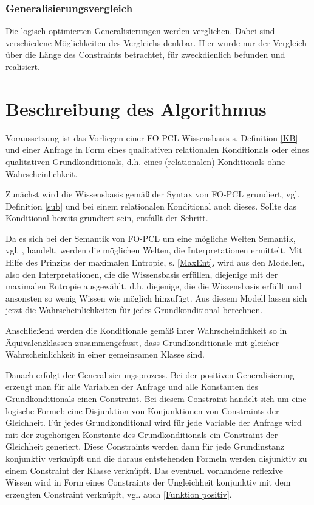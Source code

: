 \documentclass[a4paper, 11pt]{book}
\begin{document}
{\subsubsection{Generalisierungsvergleich}
Die logisch optimierten Generalisierungen werden verglichen. Dabei sind verschiedene Möglichkeiten des Vergleichs denkbar. Hier wurde nur der Vergleich über die Länge des Constraints betrachtet, für zweckdienlich befunden und realisiert.

\section{Beschreibung des Algorithmus}
Voraussetzung ist das Vorliegen einer FO-PCL Wissensbasis  s. Definition \ref{KB} und einer Anfrage in Form eines qualitativen relationalen Konditionals oder eines qualitativen Grundkonditionals, d.h. eines (relationalen) Konditionals ohne Wahrscheinlichkeit.

Zunächst wird die Wissensbasis gemäß der Syntax von FO-PCL grundiert, vgl. Definition \ref{sub}  und bei einem relationalen Konditional auch dieses. Sollte das Konditional bereits grundiert sein, entfällt der Schritt.

Da es sich bei der Semantik von FO-PCL um eine mögliche Welten Semantik, vgl. \cite{GT07}, handelt, werden die möglichen Welten, die Interpretationen ermittelt. Mit Hilfe des Prinzips der maximalen Entropie, s. \ref{MaxEnt},  wird aus den Modellen, also den Interpretationen, die die Wissensbasis erfüllen, diejenige mit der maximalen Entropie ausgewählt, d.h. diejenige, die die Wissensbasis erfüllt und ansonsten so wenig Wissen wie möglich hinzufügt.
Aus diesem Modell lassen sich jetzt die Wahrscheinlichkeiten für jedes Grundkonditional berechnen.


Anschließend werden die Konditionale gemäß ihrer Wahrscheinlichkeit so in Äquivalenzklassen zusammengefasst, dass Grundkonditionale mit gleicher Wahrscheinlichkeit in einer gemeinsamen Klasse sind. 

Danach erfolgt der Generalisierungsprozess.
Bei der positiven Generalisierung  erzeugt man für alle Variablen der Anfrage und alle Konstanten des Grundkonditionals einen Constraint. Bei diesem Constraint handelt sich um eine logische Formel: eine Disjunktion von Konjunktionen von Constraints der Gleichheit. Für jedes Grundkonditional wird für jede Variable der Anfrage wird mit der zugehörigen Konstante des Grundkonditionals ein Constraint der Gleichheit generiert. Diese Constraints werden dann für jede Grundinstanz konjunktiv verknüpft und die daraus entstehenden Formeln werden disjunktiv zu einem Constraint der Klasse verknüpft. Das eventuell vorhandene reflexive Wissen wird in Form eines Constraints der Ungleichheit konjunktiv mit dem erzeugten Constraint verknüpft, vgl. auch \ref{Funktion positiv}.

}
\end{document}
